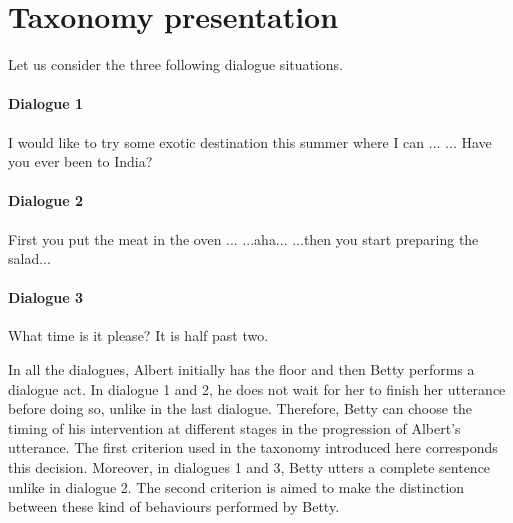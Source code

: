 \section{Taxonomy presentation}

        Let us consider the three following dialogue situations.

        \paragraph{Dialogue 1}

        \begin{dialogue}
           I would like to try some exotic destination this summer where I can ...
           ... Have you ever been to India?
        \end{dialogue}

        \paragraph{Dialogue 2}

        \begin{dialogue}
           First you put the meat in the oven ...
           ...aha...
           ...then you start preparing the salad...
        \end{dialogue}

        \paragraph{Dialogue 3}

        \begin{dialogue}
           What time is it please?
           It is half past two.
        \end{dialogue}

        In all the dialogues, Albert initially has the floor and then Betty performs a dialogue act. In dialogue 1 and 2, he does not wait for her to finish her utterance before doing so, unlike in the last dialogue. Therefore, Betty can choose the timing of his intervention at different stages in the progression of Albert's utterance. The first criterion used in the taxonomy introduced here corresponds this decision. Moreover, in dialogues 1 and 3, Betty utters a complete sentence unlike in dialogue 2. The second criterion is aimed to make the distinction between these kind of behaviours performed by Betty.

